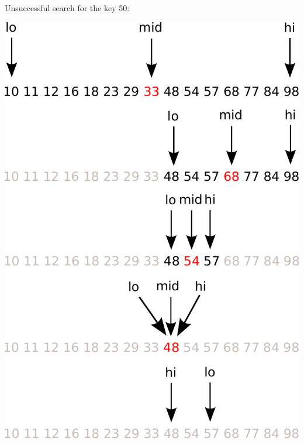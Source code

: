 \documentclass[8pt,a4paper,compress]{beamer}
\begin{document}
\begin{frame}[fragile]
\pause

Unsuccessful search for the key 50:

\begin{center}
\includegraphics[scale=0.4]{./figures/bs2.pdf}
\end{center}
\end{frame}
\end{document}
